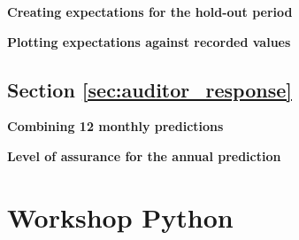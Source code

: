 \begin{exercise}
\label{ex:expectations}

\textbf{Creating expectations for the hold-out period}




\end{exercise}

\begin{exercise}
\label{ex:Plotting_expectations_against_recorded_values}

\textbf{Plotting expectations against recorded values}



\end{exercise}

\subsection{Section \ref{sec:auditor_response}}

\begin{exercise}
\label{ex:Combining_12_monthly_predictions}

\textbf{Combining 12 monthly predictions}






\end{exercise}

\begin{exercise}
\label{ex:level_of_assurance_for_the_annual_prediction}

\textbf{Level of assurance for the annual prediction}








\end{exercise}



\section{Workshop Python} %
\label{sec:workshop_7_python}

